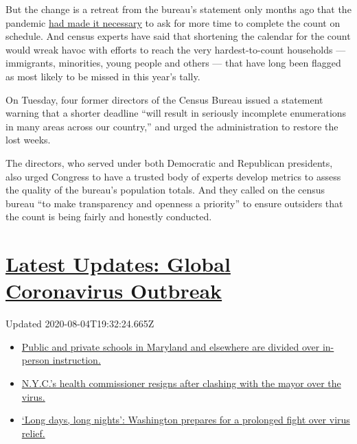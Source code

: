 But the change is a retreat from the bureau's statement only months ago
that the pandemic
\href{https://www.nytimes.com/2020/04/13/us/census-coronavirus-delay.html?searchResultPosition=12}{had
made it necessary} to ask for more time to complete the count on
schedule. And census experts have said that shortening the calendar for
the count would wreak havoc with efforts to reach the very
hardest-to-count households --- immigrants, minorities, young people and
others --- that have long been flagged as most likely to be missed in
this year's tally.

On Tuesday, four former directors of the Census Bureau issued a
statement warning that a shorter deadline ``will result in seriously
incomplete enumerations in many areas across our country,'' and urged
the administration to restore the lost weeks.

The directors, who served under both Democratic and Republican
presidents, also urged Congress to have a trusted body of experts
develop metrics to assess the quality of the bureau's population totals.
And they called on the census bureau ``to make transparency and openness
a priority'' to ensure outsiders that the count is being fairly and
honestly conducted.

\hypertarget{latest-updates-global-coronavirus-outbreak}{%
\section{\texorpdfstring{\href{https://www.nytimes.com/2020/08/04/world/coronavirus-cases.html?action=click\&pgtype=Article\&state=default\&region=MAIN_CONTENT_1\&context=storylines_live_updates}{Latest
Updates: Global Coronavirus
Outbreak}}{Latest Updates: Global Coronavirus Outbreak}}\label{latest-updates-global-coronavirus-outbreak}}

Updated 2020-08-04T19:32:24.665Z

\begin{itemize}
\tightlist
\item
  \href{https://www.nytimes.com/2020/08/04/world/coronavirus-cases.html?action=click\&pgtype=Article\&state=default\&region=MAIN_CONTENT_1\&context=storylines_live_updates\#link-4825b93}{Public
  and private schools in Maryland and elsewhere are divided over
  in-person instruction.}
\item
  \href{https://www.nytimes.com/2020/08/04/world/coronavirus-cases.html?action=click\&pgtype=Article\&state=default\&region=MAIN_CONTENT_1\&context=storylines_live_updates\#link-4d1eafa8}{N.Y.C.'s
  health commissioner resigns after clashing with the mayor over the
  virus.}
\item
  \href{https://www.nytimes.com/2020/08/04/world/coronavirus-cases.html?action=click\&pgtype=Article\&state=default\&region=MAIN_CONTENT_1\&context=storylines_live_updates\#link-6b644638}{`Long
  days, long nights': Washington prepares for a prolonged fight over
  virus relief.}
\end{itemize}

